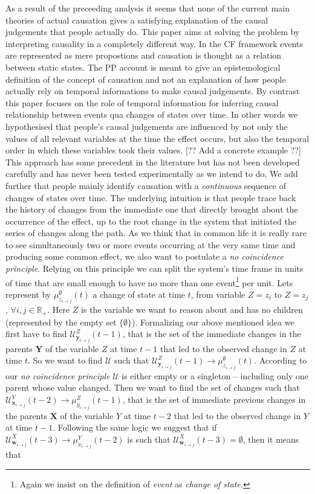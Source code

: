 \documentclass[10pt,letterpaper]{article}
\begin{document}
As a result of the preceeding analysis it seems that none of the current main theories of actual causation gives a satisfying explanation of the causal judgements that people actually do. This paper aims at solving the problem by interpreting causality in a completely different way. In the CF framework events are represented as mere propostions and causation is thought as a relation between static states. The PP account is meant to give an epistemological definition of the concept of causation and not an explanation of how people actually rely on temporal informations to make causal judgements. By contrast this paper focuses on the role of temporal information for inferring causal relationship between events qua changes of states over time. In other words we hypothesised that people's causal judgements are influenced by not only the values of all relevant variables at the time the effect occurs, but also the temporal order in which these variables took their values. [?? Add a concrete example ??] This approach has some precedent in the literature but has not been developed carefully and has never been tested experimentally as we intend to do. We add further that people mainly identify causation with a \textit{continuous} sequence of changes of states over time. The underlying intuition is that people trace back the history of changes from the immediate one that directly brought about the occurrence of the effect, up to the root change in the system that initiated the series of changes along the path. As we think that in common life it is really rare to see simultaneously two or more events occurring at the very same time and producing some common effect, we also want to postulate a \textit{no coincidence principle}. Relying on this principle we can split the system's time frame in units of time that are small enough to have no more than one event\footnote{Again we insist on the definition of \textit{event} as \textit{change of state}.} per unit. Lets represent by $\mu^{\emptyset}_{z_{i\rightarrow j}}(t)$ a change of state at time $t$, from variable $Z=z_i$ to $Z=z_j$, $\forall i,j\in \mathds{R}_+$. Here $Z$ is the variable we want to reason about and has no children (represented by the empty set $\{\emptyset\}$). Formalizing our above mentioned idea we first have to find $\mathcal{U}^Z_{\bm{y}_{i\rightarrow j}}(t-1)$, that is the set of the immediate changes in the parents $\bm{Y}$ of the variable $Z$ at time $t-1$ that led to the observed change in $Z$ at time $t$. So we want to find $\mathcal{U}$ such that $\mathcal{U}^Z_{\bm{y}_{i\rightarrow j}}(t-1)\rightarrow \mu^{\emptyset}_{z_{i\rightarrow j}}(t)$. According to our \textit{no coincidence principle} $\mathcal{U}$ is either empty or a singleton -- including only one parent whose value changed. Then we want to find the set of changes such that $\mathcal{U}^Y_{\bm{x}_{i\rightarrow j}}(t-2)\rightarrow \mu^{Z}_{y_{i\rightarrow j}}(t-1)$, that is the set of immediate previous changes in the parents $\bm{X}$ of the variable $Y$ at time $t-2$ that led to the observed change in $Y$ at time $t-1$. Following the same logic we suggest that if $\mathcal{U}^X_{\bm{w}_{i\rightarrow j}}(t-3)\rightarrow \mu^{Y}_{x_{i\rightarrow j}}(t-2)$ is such that $\mathcal{U}^X_{\bm{w}_{i\rightarrow j}}(t-3)=\emptyset$, then it means that 
\end{document}
